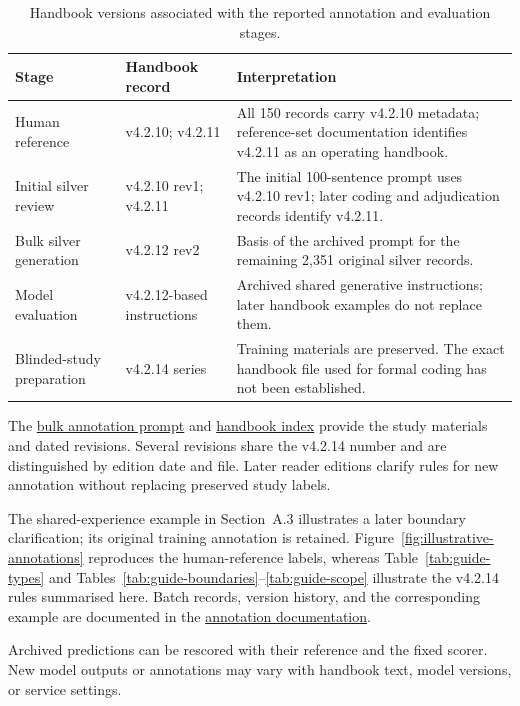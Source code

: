 \begin{table}[!htbp]
\caption{Handbook versions associated with the reported annotation and evaluation stages.}
\label{tab:handbook-stage-records}
\centering\small
\setlength{\tabcolsep}{4pt}
\begin{tabularx}{\linewidth}{@{}P{.22\linewidth}P{.23\linewidth}L@{}}
\toprule
Stage & Handbook record & Interpretation \\
\midrule
Human reference & v4.2.10; v4.2.11 & All 150 records carry v4.2.10 metadata; reference-set documentation identifies v4.2.11 as an operating handbook. \\
Initial silver review & v4.2.10 rev1; v4.2.11 & The initial 100-sentence prompt uses v4.2.10 rev1; later coding and adjudication records identify v4.2.11. \\
Bulk silver generation & v4.2.12 rev2 & Basis of the archived prompt for the remaining 2,351 original silver records. \\
Model evaluation & v4.2.12-based instructions & Archived shared generative instructions; later handbook examples do not replace them. \\
Blinded-study preparation & v4.2.14 series & Training materials are preserved. The exact handbook file used for formal coding has not been established. \\
\bottomrule
\end{tabularx}
\end{table}

The \href{https://github.com/AlfredJamesLi/chinese-skillspan-benchmark/blob/main/reproduction/silver_prompt_api_v1/archive/silver_rev2_original.txt}{bulk annotation prompt} and \href{https://github.com/AlfredJamesLi/chinese-skillspan-benchmark/blob/main/notes/handbooks/README.md}{handbook index} provide the study materials and dated revisions. Several revisions share the v4.2.14 number and are distinguished by edition date and file. Later reader editions clarify rules for new annotation without replacing preserved study labels.

The shared-experience example in Section~A.3 illustrates a later boundary clarification; its original training annotation is retained. Figure~\ref{fig:illustrative-annotations} reproduces the human-reference labels, whereas Table~\ref{tab:guide-types} and Tables~\ref{tab:guide-boundaries}--\ref{tab:guide-scope} illustrate the v4.2.14 rules summarised here. Batch records, version history, and the corresponding example are documented in the \href{https://github.com/AlfredJamesLi/chinese-skillspan-benchmark/blob/main/reproduction/annotation_documentation_20261007/README.md}{annotation documentation}.

Archived predictions can be rescored with their reference and the fixed scorer. New model outputs or annotations may vary with handbook text, model versions, or service settings.
